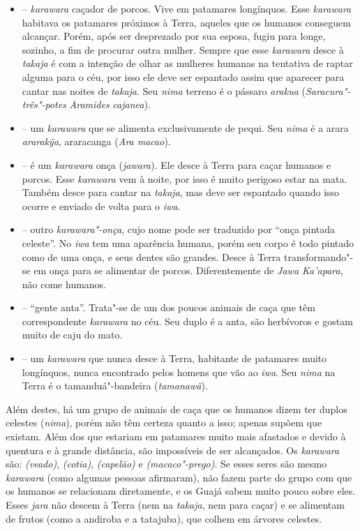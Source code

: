 \begin{itemize}
\item
  \emph{} -- \emph{karawara} caçador de porcos. Vive
  em patamares longínquos. Esse \emph{karawara} habitava os patamares
  próximos à Terra, aqueles que os humanos conseguem alcançar. Porém,
  após ser desprezado por sua esposa, fugiu para longe, sozinho, a fim
  de procurar outra mulher. Sempre que esse \emph{karawara} desce à
  \emph{takaja} é com a intenção de olhar as mulheres humanas na
  tentativa de raptar alguma para o céu, por isso ele deve ser espantado
  assim que aparecer para cantar nas noites de \emph{takaja}. Seu
  \emph{nima} terreno é o pássaro \emph{arakua}
  (\emph{Saracura"-três"-potes} \emph{Aramides} \emph{cajanea}).
\item
   -- um \emph{karawara} que se
  alimenta exclusivamente de pequi. Seu \emph{nima} é a arara
  \emph{ararakỹa}, araracanga (\emph{Ara macao}).
\item
  \emph{} -- é um \emph{karawara} onça
  (\emph{jawara}). Ele desce à Terra para caçar humanos e porcos. Esse
  \emph{karawara} vem à noite, por isso é muito perigoso estar na mata.
  Também desce para cantar na \emph{takaja}, mas deve ser espantado
  quando isso ocorre e enviado de volta para o \emph{iwa}.
\item
  \emph{} -- outro \emph{karawara"-onça}, cujo nome
  pode ser traduzido por ``onça pintada celeste''. No \emph{iwa} tem uma
  aparência humana, porém seu corpo é todo pintado como de uma onça, e
  seus dentes são grandes. Desce à Terra transformando"-se em onça para
  se alimentar de porcos. Diferentemente de \emph{Jawa
  Ka'apara}, não come humanos.
\item
  \emph{} -- ``gente anta''. Trata"-se de um dos
  poucos animais de caça que têm correspondente \emph{karawara} no céu.
  Seu duplo é a anta, são herbívoros e gostam muito de caju do mato.
\item
  \emph{} -- um \emph{karawara} que nunca desce à
  Terra, habitante de patamares muito longínquos, nunca encontrado pelos
  homens que vão ao \emph{iwa}. Seu \emph{nima} na Terra é o
  tamanduá"-bandeira (\emph{tamanawã}).
\end{itemize}

Além destes, há um grupo de animais de caça que os humanos dizem ter
duplos celestes (\emph{nima}), porém não têm certeza quanto a isso;
apenas supõem que existam. Além dos que estariam em patamares muito mais
afastados e devido à quentura e à grande distância, são impossíveis de
ser alcançados. Os \emph{karawara} são: \emph{
(veado)}, \emph{ (cotia)}, \emph{
(capelão)} e \emph{ (macaco"-prego)}. Se esses seres
são mesmo \emph{karawara} (como algumas pessoas afirmaram), não fazem
parte do grupo com que os humanos se relacionam diretamente, e os Guajá
sabem muito pouco sobre eles. Esses \emph{jara} não descem à Terra (nem
na \emph{takaja}, nem para caçar) e se alimentam de frutos (como a
andiroba e a tatajuba), que colhem em árvores celestes.

